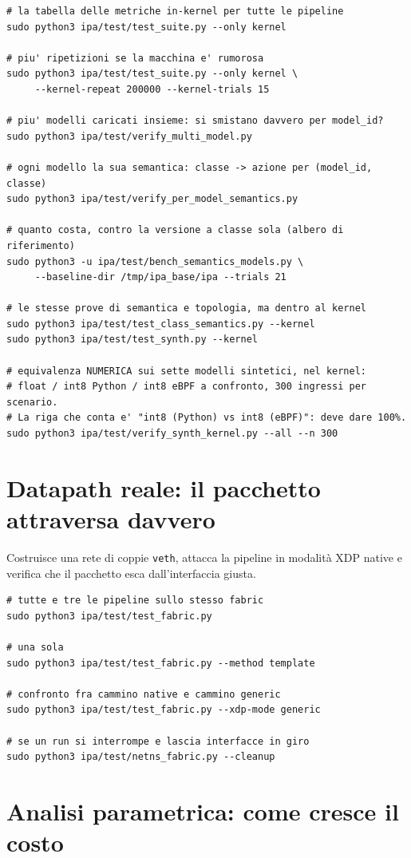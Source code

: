 \documentclass[11pt,a4paper,oneside]{report}
\begin{document}
\begin{lstlisting}
# la tabella delle metriche in-kernel per tutte le pipeline
sudo python3 ipa/test/test_suite.py --only kernel

# piu' ripetizioni se la macchina e' rumorosa
sudo python3 ipa/test/test_suite.py --only kernel \
     --kernel-repeat 200000 --kernel-trials 15

# piu' modelli caricati insieme: si smistano davvero per model_id?
sudo python3 ipa/test/verify_multi_model.py

# ogni modello la sua semantica: classe -> azione per (model_id, classe)
sudo python3 ipa/test/verify_per_model_semantics.py

# quanto costa, contro la versione a classe sola (albero di riferimento)
sudo python3 -u ipa/test/bench_semantics_models.py \
     --baseline-dir /tmp/ipa_base/ipa --trials 21

# le stesse prove di semantica e topologia, ma dentro al kernel
sudo python3 ipa/test/test_class_semantics.py --kernel
sudo python3 ipa/test/test_synth.py --kernel

# equivalenza NUMERICA sui sette modelli sintetici, nel kernel:
# float / int8 Python / int8 eBPF a confronto, 300 ingressi per scenario.
# La riga che conta e' "int8 (Python) vs int8 (eBPF)": deve dare 100%.
sudo python3 ipa/test/verify_synth_kernel.py --all --n 300
\end{lstlisting}

\section{Datapath reale: il pacchetto attraversa davvero}

Costruisce una rete di coppie \texttt{veth}, attacca la pipeline in modalità
XDP native e verifica che il pacchetto esca dall'interfaccia giusta.

\begin{lstlisting}
# tutte e tre le pipeline sullo stesso fabric
sudo python3 ipa/test/test_fabric.py

# una sola
sudo python3 ipa/test/test_fabric.py --method template

# confronto fra cammino native e cammino generic
sudo python3 ipa/test/test_fabric.py --xdp-mode generic

# se un run si interrompe e lascia interfacce in giro
sudo python3 ipa/test/netns_fabric.py --cleanup
\end{lstlisting}

\section{Analisi parametrica: come cresce il costo}
\end{document}
